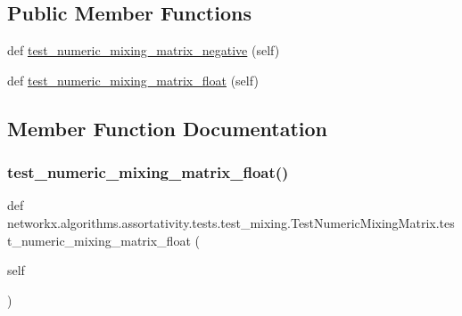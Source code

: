 \subsection*{Public Member Functions}
\begin{DoxyCompactItemize}
\item 
def \hyperlink{classnetworkx_1_1algorithms_1_1assortativity_1_1tests_1_1test__mixing_1_1TestNumericMixingMatrix_a40fe02cacc64a0e268049550f6446036}{test\+\_\+numeric\+\_\+mixing\+\_\+matrix\+\_\+negative} (self)
\item 
def \hyperlink{classnetworkx_1_1algorithms_1_1assortativity_1_1tests_1_1test__mixing_1_1TestNumericMixingMatrix_a63a690fe96e93be67add5ee2da501add}{test\+\_\+numeric\+\_\+mixing\+\_\+matrix\+\_\+float} (self)
\end{DoxyCompactItemize}


\subsection{Member Function Documentation}
\mbox{\label{classnetworkx_1_1algorithms_1_1assortativity_1_1tests_1_1test__mixing_1_1TestNumericMixingMatrix_a63a690fe96e93be67add5ee2da501add}} 
\subsubsection{\texorpdfstring{test\+\_\+numeric\+\_\+mixing\+\_\+matrix\+\_\+float()}{test\_numeric\_mixing\_matrix\_float()}}
{\footnotesize\ttfamily def networkx.\+algorithms.\+assortativity.\+tests.\+test\+\_\+mixing.\+Test\+Numeric\+Mixing\+Matrix.\+test\+\_\+numeric\+\_\+mixing\+\_\+matrix\+\_\+float (\begin{DoxyParamCaption}\item[{}]{self }\end{DoxyParamCaption})}

